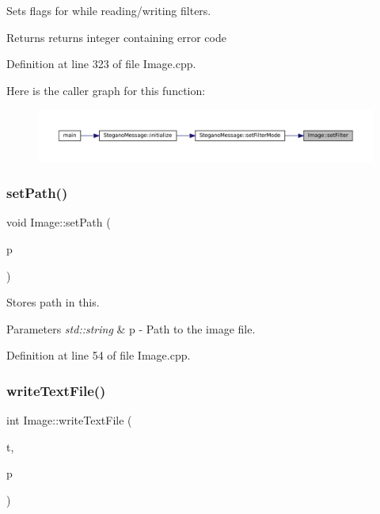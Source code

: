 Sets flags for while reading/writing filters. 

\begin{DoxyReturn}{Returns}
returns integer containing error code 
\end{DoxyReturn}


Definition at line 323 of file Image.\+cpp.

Here is the caller graph for this function\+:\nopagebreak
\begin{figure}[H]
\begin{center}
\leavevmode
\includegraphics[width=350pt]{classImage_ac81078a3d6c364aada9afc3c8a668ef8_icgraph}
\end{center}
\end{figure}
\mbox{\label{classImage_aabb8cec47c25c0e3a36ba2a455c2aa6c}} 
\subsubsection{\texorpdfstring{setPath()}{setPath()}}
{\footnotesize\ttfamily void Image\+::set\+Path (\begin{DoxyParamCaption}\item[{std\+::string}]{p }\end{DoxyParamCaption})}



Stores path in this. 


\begin{DoxyParams}{Parameters}
{\em std\+::string} & p -\/ Path to the image file. \\
\hline
\end{DoxyParams}


Definition at line 54 of file Image.\+cpp.

\mbox{\label{classImage_a2dc30c9d6280b8c0edd2f4f0ab474a5c}} 
\subsubsection{\texorpdfstring{writeTextFile()}{writeTextFile()}}
{\footnotesize\ttfamily int Image\+::write\+Text\+File (\begin{DoxyParamCaption}\item[{std\+::string}]{t,  }\item[{std\+::string}]{p }\end{DoxyParamCaption})}



